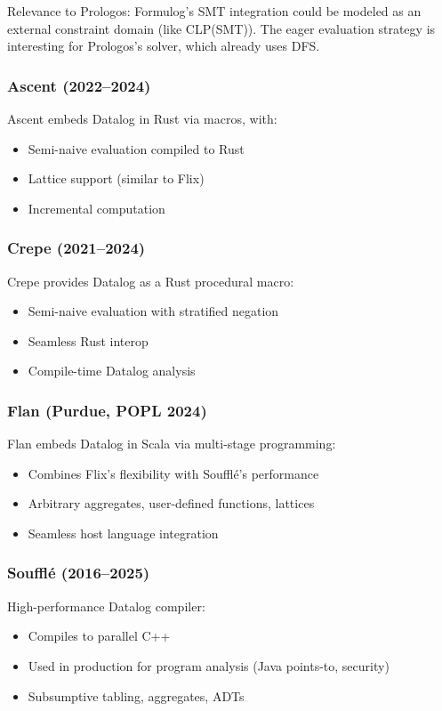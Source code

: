 \documentclass[11pt]{article}
\begin{document}
Relevance to Prologos: Formulog's SMT integration could be modeled as an
external constraint domain (like CLP(SMT)). The eager evaluation strategy
is interesting for Prologos's solver, which already uses DFS.
\subsubsection{Ascent (2022--2024)}
\label{sec:org98d8425}

Ascent embeds Datalog in Rust via macros, with:
\begin{itemize}
\item Semi-naive evaluation compiled to Rust
\item Lattice support (similar to Flix)
\item Incremental computation
\end{itemize}
\subsubsection{Crepe (2021--2024)}
\label{sec:org984b4f0}

Crepe provides Datalog as a Rust procedural macro:
\begin{itemize}
\item Semi-naive evaluation with stratified negation
\item Seamless Rust interop
\item Compile-time Datalog analysis
\end{itemize}
\subsubsection{Flan (Purdue, POPL 2024)}
\label{sec:org563e20a}

Flan embeds Datalog in Scala via multi-stage programming:
\begin{itemize}
\item Combines Flix's flexibility with Soufflé's performance
\item Arbitrary aggregates, user-defined functions, lattices
\item Seamless host language integration
\end{itemize}
\subsubsection{Soufflé (2016--2025)}
\label{sec:org6072e13}

High-performance Datalog compiler:
\begin{itemize}
\item Compiles to parallel C++
\item Used in production for program analysis (Java points-to, security)
\item Subsumptive tabling, aggregates, ADTs
\end{itemize}
\end{document}
